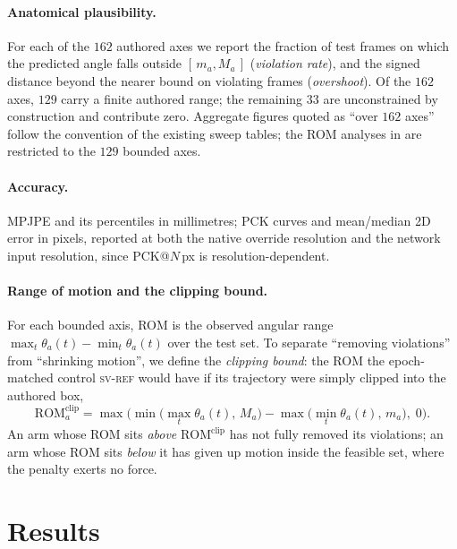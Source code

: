 \documentclass[11pt,a4paper]{article}
\newcommand{\armref}{\textsc{sv-ref}}
\begin{document}
\paragraph{Anatomical plausibility.}
For each of the $162$ authored axes we report the fraction of test frames on
which the predicted angle falls outside $[\,m_a, M_a\,]$ (\emph{violation
rate}), and the signed distance beyond the nearer bound on violating frames
(\emph{overshoot}). Of the $162$ axes, $129$ carry a finite authored range; the
remaining $33$ are unconstrained by construction and contribute zero. Aggregate
figures quoted as ``over $162$ axes'' follow the convention of the existing
sweep tables; the ROM analyses in  are restricted to the $129$
bounded axes.

\paragraph{Accuracy.}
MPJPE and its percentiles in millimetres; PCK curves and mean/median 2D error
in pixels, reported at both the native override resolution and the network
input resolution, since PCK@$N$\,px is resolution-dependent.

\paragraph{Range of motion and the clipping bound.}
For each bounded axis, ROM is the observed angular range
$\max_t \theta_a(t) - \min_t \theta_a(t)$ over the test set. To separate
``removing violations'' from ``shrinking motion'', we define the
\emph{clipping bound}: the ROM the epoch-matched control \armref{} would have
if its trajectory were simply clipped into the authored box,
\begin{equation}
  \mathrm{ROM}^{\text{clip}}_a
  = \max\!\Big(
      \min\big(\max_t \theta_a(t),\, M_a\big)
      - \max\big(\min_t \theta_a(t),\, m_a\big),
      \; 0
    \Big).
  \label{eq:clip}
\end{equation}
An arm whose ROM sits \emph{above} $\mathrm{ROM}^{\text{clip}}$ has not fully
removed its violations; an arm whose ROM sits \emph{below} it has given up
motion inside the feasible set, where the penalty exerts no force.

\section{Results}
\label{sec:results}
\end{document}
